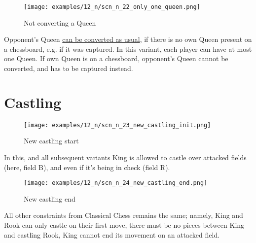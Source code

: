 \vspace*{-1.1\baselineskip}
\noindent
\begin{figure}[!h]
\texttt{[image: examples/12\_n/scn\_n\_22\_only\_one\_queen.png]}
\caption{Not converting a Queen}
\label{fig:scn_n_22_only_one_queen}
\end{figure}

Opponent's Queen
\hyperref[sec:Mayan Ascendancy/Pyramid/Conversion]{can be converted as usual},
if there is no own Queen present on a chessboard, e.g. if it was captured.
In this variant, each player can have at most one Queen. If own Queen is on
a chessboard, opponent's Queen cannot be converted, and has to be captured
instead.

\clearpage %

\section*{Castling}
\label{sec:Nineteen/Castling}

\vspace*{-1.7\baselineskip}
\noindent
\begin{figure}[!h]
\texttt{[image: examples/12\_n/scn\_n\_23\_new\_castling\_init.png]}
\vspace*{-1.3\baselineskip}
\caption{New castling start}
\label{fig:scn_n_23_new_castling_init}
\end{figure}

\vspace*{-0.7\baselineskip}
In this, and all subsequent variants King is allowed to castle over attacked fields
(here, field B), and even if it's being in check (field R).

\vspace*{-0.7\baselineskip}
\noindent
\begin{figure}[!h]
\texttt{[image: examples/12\_n/scn\_n\_24\_new\_castling\_end.png]}
\vspace*{-1.3\baselineskip}
\caption{New castling end}
\label{fig:scn_n_24_new_castling_end}
\end{figure}

\vspace*{-0.7\baselineskip}
All other constraints from Classical Chess remains the same; namely, King and Rook
can only castle on their first move, there must be no pieces between King and castling
Rook, King cannot end its movement on an attacked field.

